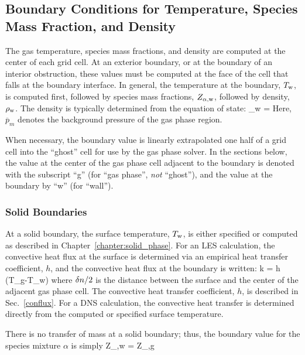 \subsection{Boundary Conditions for Temperature, Species Mass Fraction, and Density}
\label{section:TZD_bc}

The gas temperature, species mass fractions, and density are computed at the center of each grid cell. At an exterior boundary, or at
the boundary of an interior obstruction, these values must be computed at the face of the cell that falls at the boundary interface. In general, the temperature at the boundary, $T_{\rm w}$, is computed first, followed by species mass fractions, $Z_{\rm \alpha,w}$, followed by density, $\rho_{\rm w}$. The density is typically determined from the equation of state:
\be  \rho_{\rm w} =   \ee
Here, $\overline{p}_m$ denotes the background pressure of the gas phase region.

When necessary, the boundary value is linearly extrapolated one half of a grid cell into the ``ghost'' cell for use by the gas phase solver. In the sections below, the value at the center of the gas phase cell adjacent to the boundary is denoted with the subscript ``g'' (for ``gas phase'', \emph{not} ``ghost''), and the value at the boundary by ``w'' (for ``wall'').

\subsubsection{Solid Boundaries}

At a solid boundary, the surface temperature, $T_{\rm w}$, is either specified or computed as described in Chapter~\ref{chapter:solid_phase}. For an LES calculation, the convective heat flux at the surface is determined via an empirical heat transfer coefficient, $h$, and the convective heat flux at the boundary is written:
\be
   k  = h \; (T_{\rm g}-T_{\rm w})  \label{ebal}
\ee
where $\delta n/2$ is the distance between the surface and the center of the adjacent gas phase cell. The convective heat transfer coefficient, $h$, is described in Sec.~\ref{conflux}. For a DNS calculation, the convective heat transfer is determined directly from the computed or specified surface temperature.

There is no transfer of mass at a solid boundary; thus, the boundary value for the species mixture $\alpha$ is simply
\be Z_{\rm \alpha,w} = Z_{\rm \alpha,g} \ee

